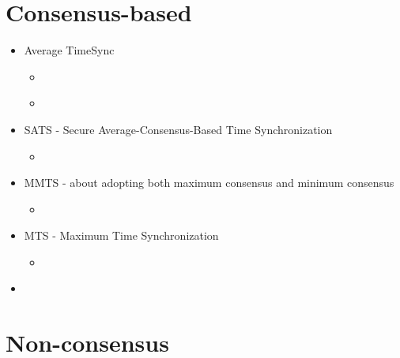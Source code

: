 \documentclass[a4paper,12pt]{article}
\begin{document}
\section{Consensus-based}

\begin{itemize}
\item Average TimeSync
  \begin{itemize}
  \item \cite{SchenatoGamba07}
  \item \cite{LucaFiorentin11}
  \end{itemize}
\end{itemize}

\begin{itemize}
\item SATS - Secure Average-Consensus-Based Time Synchronization
  \begin{itemize}
  \item \cite{HeChengShiChen13}
  \end{itemize}
\end{itemize}

\begin{itemize}
\item MMTS - about adopting both maximum consensus and minimum consensus
  \begin{itemize}
  \item \cite{HeLiChenCheng13}
  \end{itemize}
\end{itemize}

\begin{itemize}
\item MTS - Maximum Time Synchronization
  \begin{itemize}
    \item \cite{HeChengShiChen14}
  \end{itemize}
\end{itemize}

\begin{itemize}
\item 
\end{itemize}



\section{Non-consensus}
\end{document}
